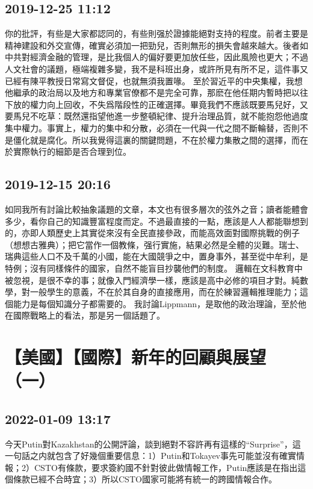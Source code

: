 \documentclass[twocolumn]{ctexart}
\begin{document}
\subsection*{2019-12-25 11:12}

你的批評，有些是大家都認同的，有些則强於證據能絕對支持的程度。前者主要是精神建設和外交宣傳，確實必須加一把勁兒，否則無形的損失會越來越大。後者如中共對經濟金融的管理，是比我個人的偏好要更加放任些，因此風險也更大；不過人文社會的議題，極端複雜多變，我不是科班出身，或許所見有所不足，這件事又已經有陳平教授日常寫文督促，也就無須我置喙。 
至於習近平的中央集權，我想他繼承的政治局以及地方和專業官僚都不是完全可靠，那麽在他任期内暫時把以往下放的權力向上回收，不失爲階段性的正確選擇。畢竟我們不應該既要馬兒好，又要馬兒不吃草：既然還指望他進一步整頓紀律、提升治理品質，就不能抱怨他過度集中權力。事實上，權力的集中和分散，必須在一代與一代之間不斷輪替，否則不是僵化就是腐化。所以我覺得這裏的關鍵問題，不在於權力集散之間的選擇，而在於實際執行的細節是否合理到位。
\subsection*{2019-12-15 20:16}

如同我所有討論比較抽象議題的文章，本文也有很多層次的弦外之音；讀者能體會多少，看你自己的知識豐富程度而定。不過最直接的一點，應該是人人都能聯想到的，亦即人類歷史上其實從來沒有全民直接參政，而能高效面對國際挑戰的例子（想想古雅典）；把它當作一個教條，强行實施，結果必然是全體的災難。瑞士、瑞典這些人口不及千萬的小國，能在大國競爭之中，置身事外，甚至從中牟利，是特例；沒有同樣條件的國家，自然不能盲目抄襲他們的制度。 
邏輯在文科教育中被忽視，是很不幸的事；就像入門經濟學一樣，應該是高中必修的項目才對。純數學，對一般學生的意義，不在於其自身的直接應用，而在於練習邏輯推理能力；這個能力是每個知識分子都需要的。 
我討論Lippmann，是取他的政治理論，至於他在國際戰略上的看法，那是另一個話題了。
\section*{【美國】【國際】新年的回顧與展望（一）}
\subsection*{2022-01-09 13:17}

今天Putin對Kazakhstan的公開評論，談到絕對不容許再有這樣的“Surprise”，這一句話之内就包含了好幾個重要信息：1）Putin和Tokayev事先可能並沒有確實情報；2）CSTO有條款，要求簽約國不針對彼此做情報工作，Putin應該是在指出這個條款已經不合時宜；3）所以CSTO國家可能將有統一的跨國情報合作。
\end{document}
